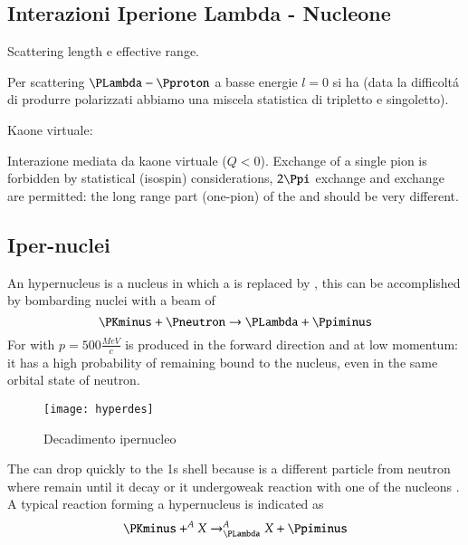 \documentclass[main.tex]{subfiles}
\begin{document}
\subsection{Interazioni Iperione Lambda - Nucleone}

\begin{enumerate*}
\item Scattering length e effective range.

\end{enumerate*}


Per scattering $\PLambda-\Pproton$ a basse energie $l=0$ si ha  (data la difficolt\'a di produrre \PLambda polarizzati abbiamo una miscela statistica di tripletto e singoletto).

Kaone virtuale:

Interazione \Pproton\PLambda mediata da kaone virtuale ($Q<0$).
Exchange of a single pion is forbidden by statistical (isospin) considerations, $2\Ppi$ exchange and \PK exchange are permitted: the long range part (one-pion) of the \PLambda\Pproton and \Pproton\Pneutron should be very different.
 
\subsection{Iper-nuclei}

An hypernucleus is a nucleus in which a \Pneutron is replaced by \PLambda, this can be accomplished by bombarding nuclei with a beam of \PKminus
\begin{equation*}
\PKminus+\Pneutron\rightarrow\PLambda+\Ppiminus
\end{equation*}
For \PKminus with $p=500 \frac{MeV}{c}$ \Ppiminus is produced in the forward direction and \PLambda at low momentum: it has a high probability of remaining bound to the nucleus, even in the same orbital state of neutron.


\begin{figure}[!ht]
\centering
\texttt{[image: hyperdes]}
\caption{Decadimento ipernucleo}
\label{fig:hyperdes}
\end{figure}


The \PLambda can drop quickly to the 1s shell because is a different particle from neutron where remain until it decay \lbt{\PLambda\rightarrow\Pproton+\Ppiminus}{\PLambda\rightarrow\Pneutron+\Ppizero} or it undergoweak reaction with one of the nucleons \lbt{\PLambda+\Pneutron\rightarrow\Pneutron+\Pneutron}{\PLambda+\Pproton\rightarrow\Pneutron+\Pproton}. A typical reaction forming a hypernucleus is indicated as
\begin{equation*}
\PKminus+^AX\rightarrow^A_{\PLambda}X+\Ppiminus
\end{equation*}
\end{document}
